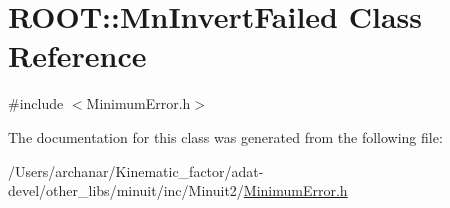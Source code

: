 \hypertarget{classROOT_1_1Minuit2_1_1MinimumError_1_1MnInvertFailed}{}\section{R\+O\+OT\+:\+:Mn\+Invert\+Failed Class Reference}
\label{classROOT_1_1Minuit2_1_1MinimumError_1_1MnInvertFailed}


{\ttfamily \#include $<$Minimum\+Error.\+h$>$}



The documentation for this class was generated from the following file\+:\begin{DoxyCompactItemize}
\item 
/\+Users/archanar/\+Kinematic\+\_\+factor/adat-\/devel/other\+\_\+libs/minuit/inc/\+Minuit2/\mbox{\hyperlink{adat-devel_2other__libs_2minuit_2inc_2Minuit2_2MinimumError_8h}{Minimum\+Error.\+h}}\end{DoxyCompactItemize}
